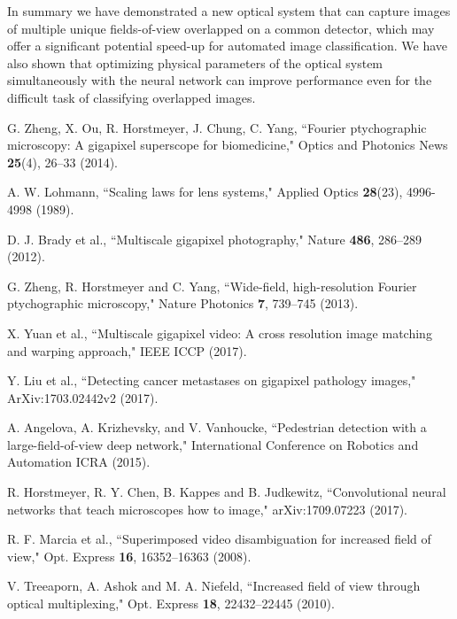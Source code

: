 \documentclass{article}
\begin{document}
In summary we have demonstrated a new optical system that can capture images of multiple unique fields-of-view overlapped on a common detector, which may offer a significant potential speed-up for automated image classification. We have also shown that optimizing physical parameters of the optical system simultaneously with the neural network can improve performance even for the difficult task of classifying overlapped images.



\begin{thebibliography}{99}

 G. Zheng, X. Ou, R. Horstmeyer, J. Chung, C. Yang, ``Fourier ptychographic microscopy: A gigapixel superscope for biomedicine," Optics and Photonics News {\bf 25}(4), 26--33 (2014).

 A. W. Lohmann, ``Scaling laws for lens systems," Applied Optics {\bf 28}(23), 4996-4998 (1989).

 D. J. Brady et al., ``Multiscale gigapixel photography," Nature {\bf 486}, 286--289 (2012).

 G. Zheng, R. Horstmeyer and C. Yang, ``Wide-field, high-resolution Fourier ptychographic microscopy," Nature Photonics {\bf 7}, 739--745 (2013).

 X. Yuan et al., ``Multiscale gigapixel video: A cross resolution image matching and warping approach," IEEE ICCP (2017).

 Y. Liu et al., ``Detecting cancer metastases on gigapixel pathology images," ArXiv:1703.02442v2 (2017).

 A. Angelova, A. Krizhevsky, and V. Vanhoucke, ``Pedestrian detection with a large-field-of-view
deep network," International Conference on Robotics and Automation ICRA (2015).

 R. Horstmeyer, R. Y. Chen, B. Kappes and B. Judkewitz, ``Convolutional neural networks that teach
microscopes how to image," arXiv:1709.07223 (2017).

 R. F. Marcia et al., ``Superimposed video disambiguation for increased field of view," Opt. Express {\bf 16},  16352--16363 (2008).

 V. Treeaporn, A. Ashok and M. A. Niefeld, ``Increased field of view through optical multiplexing," Opt. Express {\bf 18}, 22432--22445 (2010).


\end{thebibliography}
\end{document}
